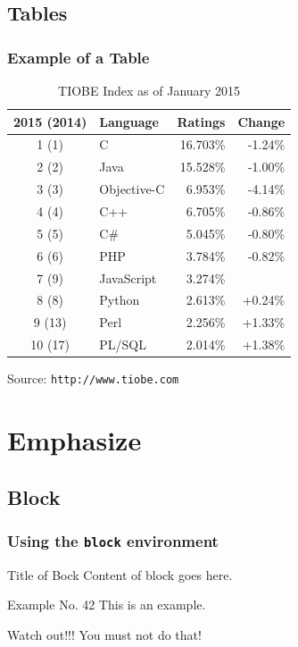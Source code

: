 \documentclass[english]{beamer}
\begin{document}
\subsection{Tables}

\begin{frame}
 \frametitle{Example of a Table}
\begin{table}[ht]
 \begin{tabular}{clrr} \toprule
 2015 (2014)	& 	Language 	& Ratings 	& Change \\
 \midrule
1	(1)		& C		& 16.703\%	& -1.24\% \\
2	   (2)		& Java	& 15.528\%	& -1.00\% \\
3	   (3)		& Objective-C	& 6.953\%	& -4.14\% \\
4	   (4)		& C++	& 6.705\%	& -0.86\% \\
5	   (5)		& C\#		& 5.045\%	& -0.80\% \\
6	   (6)		& PHP	& 3.784\%	& -0.82\% \\
7	   (9)		& JavaScript	& 3.274\%	& \textem{+1.70\%} \\
8	   (8)		& Python	& 2.613\%	& +0.24\% \\
9	 (13)		& Perl	& 2.256\%	& +1.33\% \\
10	 (17)		& PL/SQL	& 2.014\%	& +1.38\% \\
\bottomrule
 \end{tabular}
 \caption{TIOBE Index as of January 2015}
\end{table}
\vspace{-3mm}
\tiny Source: \texttt{http://www.tiobe.com}
\end{frame}



\section{Emphasize}

\subsection{Block}

\begin{frame}
 \frametitle{Using the \texttt{block} environment}
\begin{block}{Title of Bock}
  Content of block goes here.
\end{block}

\begin{exampleblock}{Example No. 42}
  This is an example.
\end{exampleblock}
 
\begin{alertblock}{Watch out!!!}
  You must not do that!
\end{alertblock}
\end{frame}
\end{document}
